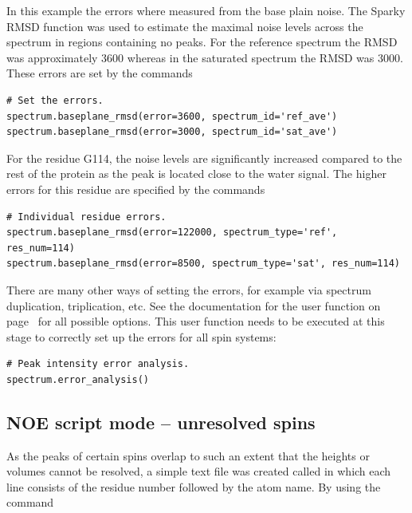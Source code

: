 In this example the errors where measured from the base plain noise.
The Sparky RMSD function was used to estimate the maximal noise levels across the spectrum in regions containing no peaks.
For the reference spectrum the RMSD was approximately 3600 whereas in the saturated spectrum the RMSD was 3000.
These errors are set by the commands

\begin{lstlisting}[firstnumber=19]
# Set the errors.
spectrum.baseplane_rmsd(error=3600, spectrum_id='ref_ave')
spectrum.baseplane_rmsd(error=3000, spectrum_id='sat_ave')
\end{lstlisting}

For the residue G114, the noise levels are significantly increased compared to the rest of the protein as the peak is located close to the water signal.
The higher errors for this residue are specified by the commands

\begin{lstlisting}[firstnumber=23]
# Individual residue errors.
spectrum.baseplane_rmsd(error=122000, spectrum_type='ref', res_num=114)
spectrum.baseplane_rmsd(error=8500, spectrum_type='sat', res_num=114)
\end{lstlisting}

There are many other ways of setting the errors, for example via spectrum duplication, triplication, etc.
See the documentation for the  user function on page~\pageref{uf: spectrum.error_analysis} for all possible options.
This user function needs to be executed at this stage to correctly set up the errors for all spin systems:

\begin{lstlisting}[firstnumber=27]
# Peak intensity error analysis.
spectrum.error_analysis()
\end{lstlisting}



\subsection{NOE script mode -- unresolved spins}

As the peaks of certain spins overlap to such an extent that the heights or volumes cannot be resolved, a simple text file was created called  in which each line consists of the residue number followed by the atom name.
By using the command

